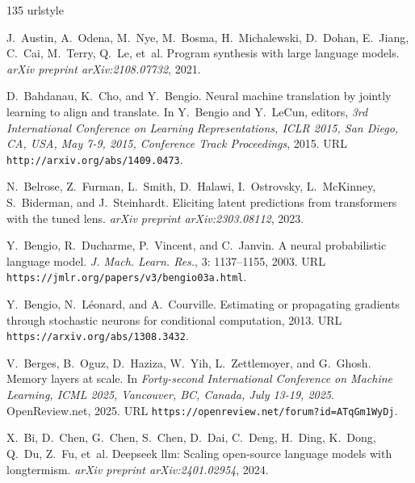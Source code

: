 \begin{thebibliography}{135}
\providecommand{\natexlab}[1]{#1}
\providecommand{\url}[1]{\texttt{#1}}
\expandafter\ifx\csname urlstyle\endcsname\relax
  \providecommand{\doi}[1]{doi: #1}\else
  \providecommand{\doi}{doi: \begingroup \urlstyle{rm}\Url}\fi

J.~Austin, A.~Odena, M.~Nye, M.~Bosma, H.~Michalewski, D.~Dohan, E.~Jiang,
  C.~Cai, M.~Terry, Q.~Le, et~al.
\newblock Program synthesis with large language models.
\newblock \emph{arXiv preprint arXiv:2108.07732}, 2021.

D.~Bahdanau, K.~Cho, and Y.~Bengio.
\newblock Neural machine translation by jointly learning to align and
  translate.
\newblock In Y.~Bengio and Y.~LeCun, editors, \emph{3rd International
  Conference on Learning Representations, {ICLR} 2015, San Diego, CA, USA, May
  7-9, 2015, Conference Track Proceedings}, 2015.
\newblock URL \url{http://arxiv.org/abs/1409.0473}.

N.~Belrose, Z.~Furman, L.~Smith, D.~Halawi, I.~Ostrovsky, L.~McKinney,
  S.~Biderman, and J.~Steinhardt.
\newblock Eliciting latent predictions from transformers with the tuned lens.
\newblock \emph{arXiv preprint arXiv:2303.08112}, 2023.

Y.~Bengio, R.~Ducharme, P.~Vincent, and C.~Janvin.
\newblock A neural probabilistic language model.
\newblock \emph{J. Mach. Learn. Res.}, 3: 1137--1155, 2003.
\newblock URL \url{https://jmlr.org/papers/v3/bengio03a.html}.

Y.~Bengio, N.~Léonard, and A.~Courville.
\newblock Estimating or propagating gradients through stochastic neurons for
  conditional computation, 2013.
\newblock URL \url{https://arxiv.org/abs/1308.3432}.

V.~Berges, B.~Oguz, D.~Haziza, W.~Yih, L.~Zettlemoyer, and G.~Ghosh.
\newblock Memory layers at scale.
\newblock In \emph{Forty-second International Conference on Machine Learning,
  {ICML} 2025, Vancouver, BC, Canada, July 13-19, 2025}. OpenReview.net, 2025.
\newblock URL \url{https://openreview.net/forum?id=ATqGm1WyDj}.

X.~Bi, D.~Chen, G.~Chen, S.~Chen, D.~Dai, C.~Deng, H.~Ding, K.~Dong, Q.~Du,
  Z.~Fu, et~al.
\newblock Deepseek llm: Scaling open-source language models with longtermism.
\newblock \emph{arXiv preprint arXiv:2401.02954}, 2024.


\end{thebibliography}
